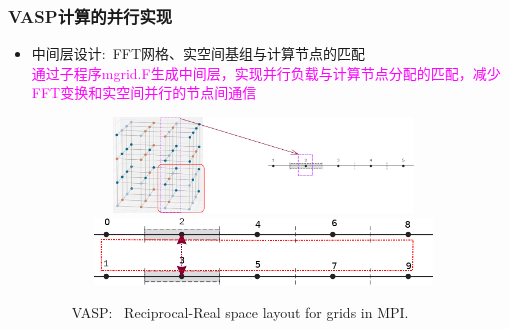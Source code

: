 \documentclass[cjk,slidestop,compress,mathserif,blue]{beamer}
\begin{document}
%
\frame
{
	\frametitle{\textrm{VASP}计算的并行实现}
	\begin{itemize}
	     \item 中间层设计:~\textrm{FFT}网格、实空间基组与计算节点的匹配\\
		     \textcolor{magenta}{通过子程序\textrm{mgrid.F}生成中间层，实现并行负载与计算节点分配的匹配，减少\textrm{FFT}变换和实空间并行的节点间通信}
\begin{figure}[h!]
	\vspace{-0.25in}
\centering
\includegraphics[height=1.0in,width=4.0in,viewport=0 0 1500 450,clip]{Figures/VASP_FFT-MPI_Reciprocal.png}
\vskip 0.5pt
\includegraphics[height=0.7in,width=4.0in,viewport=0 0 730 150,clip]{Figures/VASP_FFT-MPI_Real.png}
\caption{\tiny \textrm{VASP:~ Reciprocal-Real space layout for grids in MPI.}}%
\label{MPI-FFT}
\end{figure} 
	\end{itemize}
}
\end{document}
